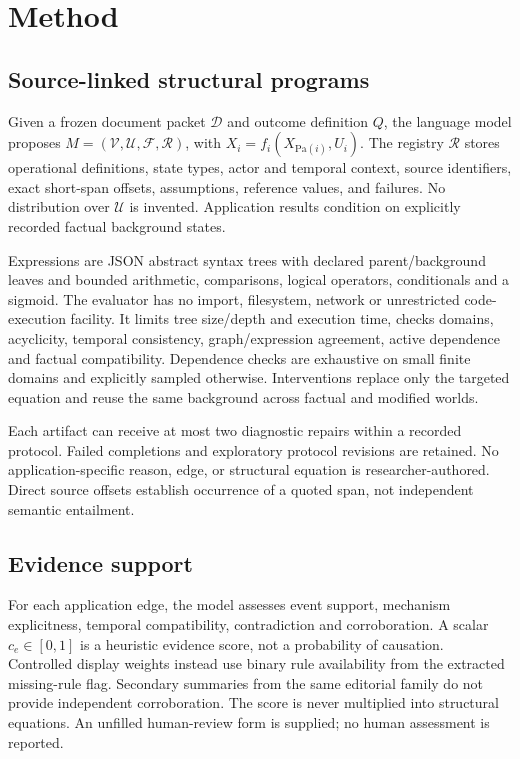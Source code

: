 \documentclass{svproc}
\begin{document}
\section{Method}
\subsection{Source-linked structural programs}
Given a frozen document packet $\mathcal D$ and outcome definition $Q$, the language model proposes $M=(\mathcal V,\mathcal U,\mathcal F,\mathcal R)$, with $X_i=f_i(X_{\mathrm{Pa}(i)},U_i)$. The registry $\mathcal R$ stores operational definitions, state types, actor and temporal context, source identifiers, exact short-span offsets, assumptions, reference values, and failures. No distribution over $\mathcal U$ is invented. Application results condition on explicitly recorded factual background states.

Expressions are JSON abstract syntax trees with declared parent/background leaves and bounded arithmetic, comparisons, logical operators, conditionals and a sigmoid. The evaluator has no import, filesystem, network or unrestricted code-execution facility. It limits tree size/depth and execution time, checks domains, acyclicity, temporal consistency, graph/expression agreement, active dependence and factual compatibility. Dependence checks are exhaustive on small finite domains and explicitly sampled otherwise. Interventions replace only the targeted equation and reuse the same background across factual and modified worlds.

Each artifact can receive at most two diagnostic repairs within a recorded protocol. Failed completions and exploratory protocol revisions are retained. No application-specific reason, edge, or structural equation is researcher-authored. Direct source offsets establish occurrence of a quoted span, not independent semantic entailment.

\subsection{Evidence support}
For each application edge, the model assesses event support, mechanism explicitness, temporal compatibility, contradiction and corroboration. A scalar $c_e\in[0,1]$ is a heuristic evidence score, not a probability of causation. Controlled display weights instead use binary rule availability from the extracted missing-rule flag. Secondary summaries from the same editorial family do not provide independent corroboration. The score is never multiplied into structural equations. An unfilled human-review form is supplied; no human assessment is reported.
\end{document}
